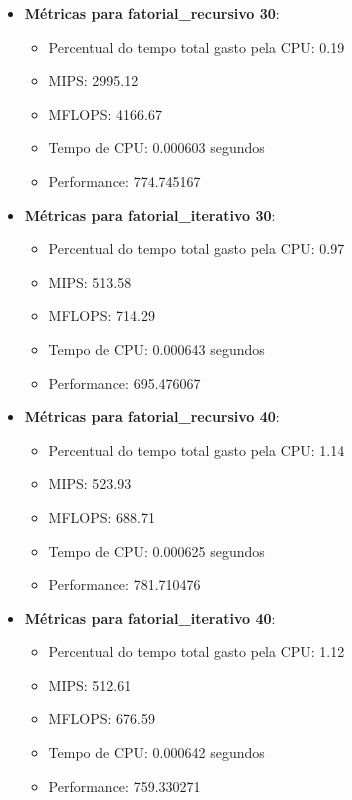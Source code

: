 \documentclass[12pt]{article}
\begin{document}
\begin{itemize}
    \item \textbf{Métricas para fatorial\_recursivo 30}:
    \begin{itemize}
        \item Percentual do tempo total gasto pela CPU: 0.19
        \item MIPS: 2995.12
        \item MFLOPS: 4166.67
        \item Tempo de CPU: 0.000603 segundos
        \item Performance: 774.745167
    \end{itemize}

    \item \textbf{Métricas para fatorial\_iterativo 30}:
    \begin{itemize}
        \item Percentual do tempo total gasto pela CPU: 0.97
        \item MIPS: 513.58
        \item MFLOPS: 714.29
        \item Tempo de CPU: 0.000643 segundos
        \item Performance: 695.476067
    \end{itemize}

    \item \textbf{Métricas para fatorial\_recursivo 40}:
    \begin{itemize}
        \item Percentual do tempo total gasto pela CPU: 1.14
        \item MIPS: 523.93
        \item MFLOPS: 688.71
        \item Tempo de CPU: 0.000625 segundos
        \item Performance: 781.710476
    \end{itemize}

    \item \textbf{Métricas para fatorial\_iterativo 40}:
    \begin{itemize}
        \item Percentual do tempo total gasto pela CPU: 1.12
        \item MIPS: 512.61
        \item MFLOPS: 676.59
        \item Tempo de CPU: 0.000642 segundos
        \item Performance: 759.330271
    \end{itemize}


\end{itemize}
\end{document}
